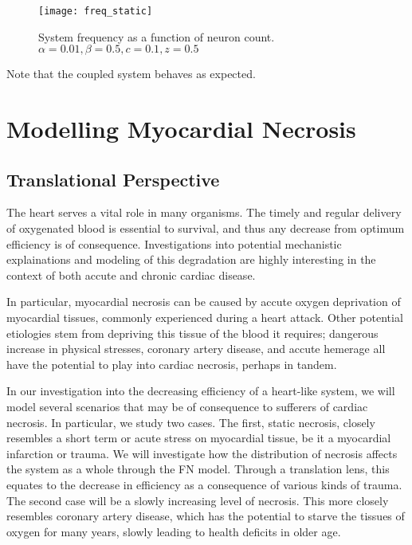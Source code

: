 \documentclass[11pt]{report}
\begin{document}
\begin{figure}[!ht]
  \caption{System frequency as a function of neuron count. $\alpha = 0.01, \beta = 0.5,c = 0.1,z=0.5$ }
  \centering
    \texttt{[image: freq\_static]}
\end{figure}

Note that the coupled system behaves as expected. 




\chapter{Modelling Myocardial Necrosis} 


\section{Translational Perspective} %

The heart serves a vital role in many organisms. The timely and regular delivery of oxygenated blood is essential to survival, and thus any decrease from optimum efficiency is of consequence. Investigations into potential mechanistic explainations and modeling of this degradation are highly interesting in the context of both accute and chronic cardiac disease.

In particular, myocardial necrosis can be caused by accute oxygen deprivation of myocardial tissues, commonly experienced during a heart attack. Other potential etiologies stem from depriving this tissue of the blood it requires; dangerous increase in physical stresses, coronary artery disease, and accute hemerage all have the potential to play into cardiac necrosis, perhaps in tandem. 

In our investigation into the decreasing efficiency of a heart-like system, we will model several scenarios that may be of consequence to sufferers of cardiac necrosis. In particular, we study two cases. The first, static necrosis, closely resembles a short term or acute stress on myocardial tissue, be it a myocardial infarction or trauma. We will investigate how the distribution of necrosis affects the system as a whole through the FN model. Through a translation lens, this equates to the decrease in efficiency as a consequence of various kinds of trauma. The second case will be a slowly increasing level of necrosis. This more closely resembles coronary artery disease, which has the potential to starve the tissues of oxygen for many years, slowly leading to health deficits in older age. 
\end{document}
